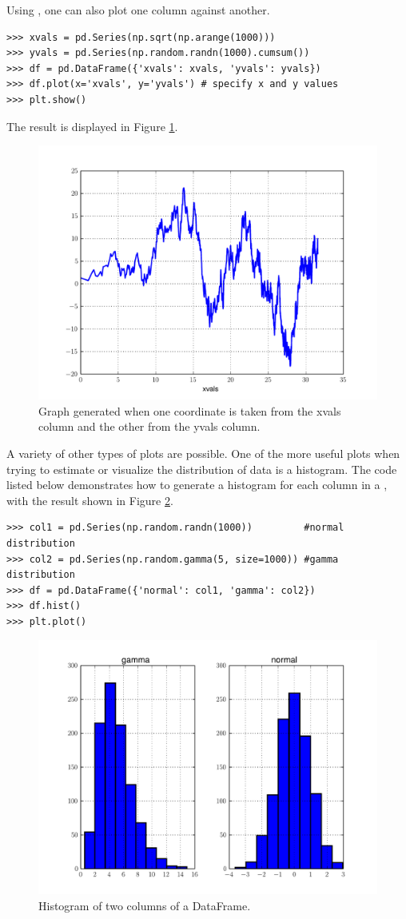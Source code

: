 Using , one can also plot one column against another.

\begin{lstlisting}
>>> xvals = pd.Series(np.sqrt(np.arange(1000)))
>>> yvals = pd.Series(np.random.randn(1000).cumsum())
>>> df = pd.DataFrame({'xvals': xvals, 'yvals': yvals})
>>> df.plot(x='xvals', y='yvals') # specify x and y values
>>> plt.show()
\end{lstlisting}

The result is displayed in Figure \ref{pandas:dfPlot}.

\begin{figure}
\centering
\includegraphics[width=.7 \textwidth]{dfPlot.pdf}
\caption{ Graph generated when one coordinate is taken from the xvals column and the other from the yvals column.}
\label{pandas:dfPlot}
\end{figure}

A variety of other types of plots are possible. One of the more useful plots when trying to estimate or
visualize the distribution of data is a histogram. The code listed below demonstrates how to generate
a histogram for each column in a , with the result shown in Figure \ref{fig:PandasHistogram}.

\begin{lstlisting}
>>> col1 = pd.Series(np.random.randn(1000))         #normal distribution
>>> col2 = pd.Series(np.random.gamma(5, size=1000)) #gamma distribution
>>> df = pd.DataFrame({'normal': col1, 'gamma': col2})
>>> df.hist()
>>> plt.plot()
\end{lstlisting}

\begin{figure}
\centering
\includegraphics[width=.7 \textwidth]{histogram.pdf}
\caption{Histogram of two columns of a DataFrame.}
\label{fig:PandasHistogram}
\end{figure}


